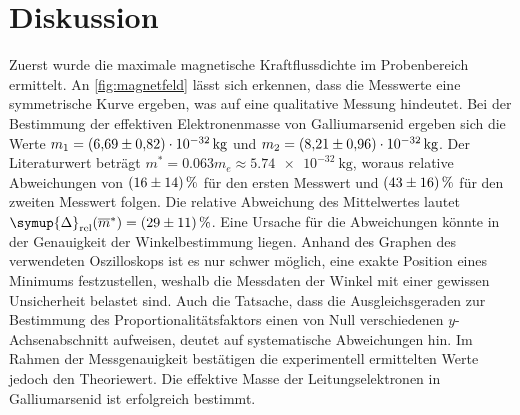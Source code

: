 \section{Diskussion}
\label{sec:Diskussion}
Zuerst wurde die maximale magnetische Kraftflussdichte im Probenbereich ermittelt. 
An \autoref{fig:magnetfeld} lässt sich erkennen, dass die Messwerte eine symmetrische Kurve ergeben, was auf eine qualitative Messung hindeutet.
Bei der Bestimmung der effektiven Elektronenmasse von Galliumarsenid ergeben sich die Werte  $m_1 = \qty{6.69+-0.82e-32}{\kilo\gram}$ und $m_2 =  \qty{8.21+-0.96e-32}{\kilo\gram}$.
Der Literaturwert beträgt $m^* = \num{0.063}m_e \approx \qty{5.74e-32}{\kilo\gram}$, woraus relative Abweichungen von $\qty{16+-14}{\percent}$ für den ersten Messwert und 
$\qty{43+-16}{\percent}$ für den zweiten Messwert folgen. Die relative Abweichung des Mittelwertes lautet $\symup{\Delta}_\text{rel} (\overline{m}^*)= \qty{29+-11}{\percent}$.
Eine Ursache für die Abweichungen könnte in der Genauigkeit der Winkelbestimmung 
liegen. Anhand des Graphen des verwendeten Oszilloskops ist es nur schwer möglich, eine exakte Position eines Minimums festzustellen, weshalb die Messdaten der Winkel mit einer 
gewissen Unsicherheit belastet sind. Auch die Tatsache, dass die Ausgleichsgeraden zur Bestimmung des Proportionalitätsfaktors einen von Null verschiedenen $y$-Achsenabschnitt 
aufweisen, deutet auf systematische Abweichungen hin.
Im Rahmen der Messgenauigkeit bestätigen die experimentell ermittelten Werte jedoch den Theoriewert.
Die effektive Masse der Leitungselektronen in Galliumarsenid ist erfolgreich bestimmt.
